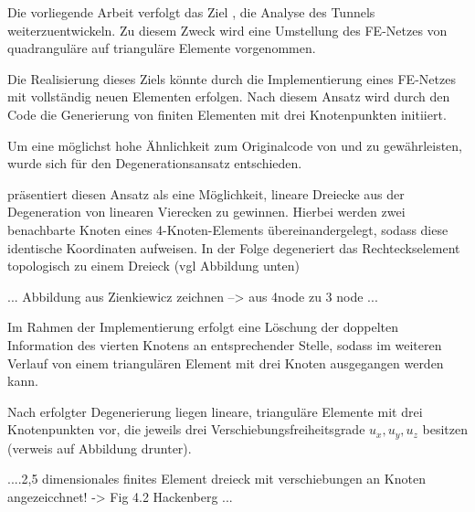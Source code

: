 Die vorliegende Arbeit verfolgt das Ziel , die Analyse des Tunnels weiterzuentwickeln. Zu diesem Zweck wird eine Umstellung des FE-Netzes von quadranguläre auf trianguläre Elemente vorgenommen.

Die Realisierung dieses Ziels könnte durch die Implementierung eines FE-Netzes mit vollständig neuen Elementen erfolgen. Nach diesem Ansatz wird durch den Code die Generierung von finiten Elementen mit drei Knotenpunkten initiiert.

Um eine möglichst hohe Ähnlichkeit zum Originalcode von \cite{Hackenberg2016} und \cite{Freisinger2022} zu gewährleisten, wurde sich für den Degenerationsansatz entschieden.

\cite{Zienkiewicz2013} präsentiert diesen Ansatz als eine Möglichkeit, lineare Dreiecke aus der Degeneration von linearen Vierecken zu gewinnen.
Hierbei werden zwei benachbarte Knoten eines 4-Knoten-Elements übereinandergelegt, sodass diese identische Koordinaten aufweisen. In der Folge degeneriert das Rechteckselement topologisch zu einem Dreieck (vgl Abbildung unten)

... Abbildung aus Zienkiewicz zeichnen --> aus 4node zu 3 node ...

Im Rahmen der Implementierung erfolgt eine Löschung der doppelten Information des vierten Knotens an entsprechender Stelle, sodass im weiteren Verlauf von einem triangulären Element mit drei Knoten ausgegangen werden kann.


Nach erfolgter Degenerierung liegen lineare, trianguläre Elemente mit drei Knotenpunkten vor, die jeweils drei Verschiebungsfreiheitsgrade \(u_x, u_y, u_z\) besitzen (verweis auf Abbildung drunter).

....2,5 dimensionales finites Element dreieck mit verschiebungen an Knoten angezeicchnet! -> Fig 4.2 Hackenberg ...

